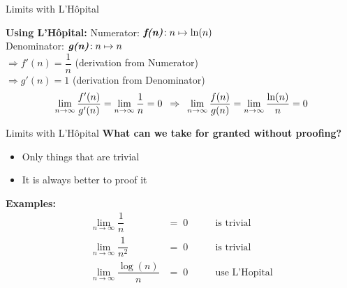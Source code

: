 
\begin{frame}{Limits with L'H\^{o}pital}
  \begin{block}{\textbf{Using L'H\^{o}pital:}}
    Numerator: \; $\textit{\textbf{f(n)}}\!: n \mapsto \ln (n)$\\
    Denominator: $\textit{\textbf{g(n)}}\!: n \mapsto n$\\
    \hspace{1.5em}
    $\Rightarrow f'(n) = \dfrac{1}{n}$ \; (derivation from Numerator)\\
    \hspace{1.5em}
    $\Rightarrow g'(n) = 1$\; (derivation from Denominator)\\
    \begin{displaymath}
      \lim\limits_{n \rightarrow \infty} \dfrac{f'(n)}{g'(n)}
        = \lim\limits_{n \rightarrow \infty} \dfrac{1}{n} = 0
      \hspace{0.5em} \Rightarrow \hspace{0.5em}
      \lim\limits_{n \rightarrow \infty} \dfrac{f(n)}{g(n)}
        = \lim\limits_{n \rightarrow \infty} \dfrac{\ln (n)}{n} = 0
    \end{displaymath}
  \end{block}
\end{frame}


\begin{frame}{Limits with L'H\^{o}pital}
  \textbf{What can we take for granted without proofing?}
  \begin{itemize}
    \item
      Only things that are trivial
    \item
      It is always better to proof it
  \end{itemize}
  \textbf{Examples:}
  \begin{eqnarray*}
    \lim\limits_{n \rightarrow \infty} \dfrac{1}{n} &= \; 0
      &\hspace{2em} \text{is trivial}\\
    \lim\limits_{n \rightarrow \infty} \dfrac{1}{n^2} &= \; 0
      &\hspace{2em} \text{is trivial}\\
    \lim\limits_{n \rightarrow \infty} \dfrac{\log (n)}{n} &= \; 0
      &\hspace{2em} \text{use L'Hopital}
  \end{eqnarray*}
\end{frame}
